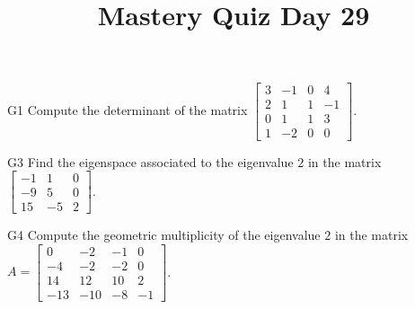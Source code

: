 \documentclass{sbgLAquiz}
\title{Mastery Quiz Day 29 }
\begin{document}
\begin{problem}{G1}
Compute the determinant of the matrix $\begin{bmatrix} 3 & -1 & 0 & 4 \\ 2 & 1 & 1& -1 \\ 0 & 1 & 1 & 3 \\ 1 & -2 & 0 & 0 \end{bmatrix}$.
\end{problem}

\begin{problem}{G3}
Find the eigenspace associated to the eigenvalue $2$ in the matrix $\begin{bmatrix} -1 & 1 & 0 \\ -9 & 5 & 0 \\ 15 & -5 & 2 \end{bmatrix}$.
\end{problem}
\newpage

\begin{problem}{G4}
Compute the geometric multiplicity of the eigenvalue $2$ in the matrix $A=\begin{bmatrix}0 & -2 & -1 & 0 \\ -4 & -2 & -2 & 0 \\ 14 & 12 & 10 & 2 \\ -13 & -10 & -8 & -1 \end{bmatrix}$.
\end{problem}
\end{document}
